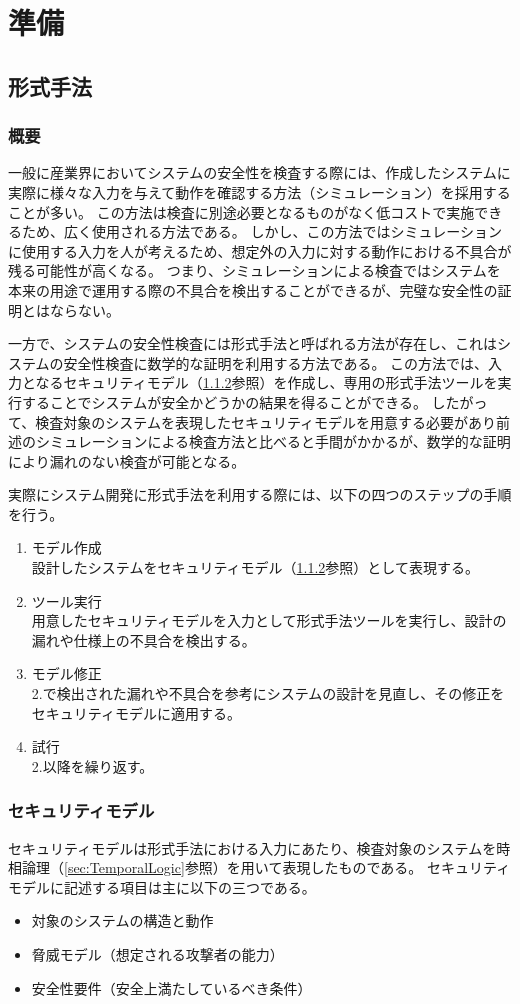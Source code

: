 \chapter{準備}
\section{形式手法}
\subsection{概要}
一般に産業界においてシステムの安全性を検査する際には、作成したシステムに実際に様々な入力を与えて動作を確認する方法（シミュレーション）を採用することが多い。
この方法は検査に別途必要となるものがなく低コストで実施できるため、広く使用される方法である。
しかし、この方法ではシミュレーションに使用する入力を人が考えるため、想定外の入力に対する動作における不具合が残る可能性が高くなる。
つまり、シミュレーションによる検査ではシステムを本来の用途で運用する際の不具合を検出することができるが、完璧な安全性の証明とはならない。

一方で、システムの安全性検査には形式手法と呼ばれる方法が存在し、これはシステムの安全性検査に数学的な証明を利用する方法である。
この方法では、入力となるセキュリティモデル（\ref{sec:SecurityModel}参照）を作成し、専用の形式手法ツールを実行することでシステムが安全かどうかの結果を得ることができる。
したがって、検査対象のシステムを表現したセキュリティモデルを用意する必要があり前述のシミュレーションによる検査方法と比べると手間がかかるが、数学的な証明により漏れのない検査が可能となる。

実際にシステム開発に形式手法を利用する際には、以下の四つのステップの手順を行う。
\begin{enumerate}
\item モデル作成\\
設計したシステムをセキュリティモデル（\ref{sec:SecurityModel}参照）として表現する。
\item ツール実行\\
用意したセキュリティモデルを入力として形式手法ツールを実行し、設計の漏れや仕様上の不具合を検出する。
\item モデル修正\\
2.で検出された漏れや不具合を参考にシステムの設計を見直し、その修正をセキュリティモデルに適用する。
\item 試行\\
2.以降を繰り返す。
\end{enumerate}

\subsection{セキュリティモデル}
\label{sec:SecurityModel}
セキュリティモデルは形式手法における入力にあたり、検査対象のシステムを時相論理（\ref{sec:TemporalLogic}参照）を用いて表現したものである。
セキュリティモデルに記述する項目は主に以下の三つである。
\begin{itemize}
\item 対象のシステムの構造と動作
\item 脅威モデル（想定される攻撃者の能力）
\item 安全性要件（安全上満たしているべき条件）
\end{itemize}

